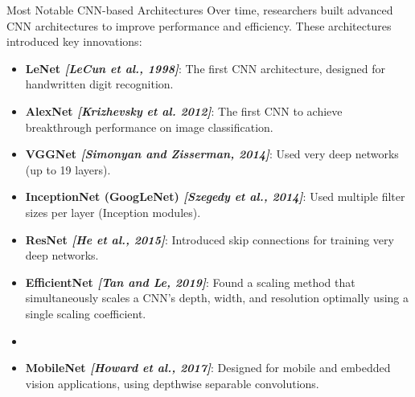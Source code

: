 \begin{frame}{Most Notable CNN-based Architectures}
Over time, researchers built advanced CNN architectures to improve performance and efficiency. These architectures introduced key innovations:
{\small
\begin{itemize}
    \item \textbf{LeNet \emph{[LeCun et al., 1998]}}: The first CNN architecture, designed for handwritten digit recognition.
    \item \textbf{AlexNet \emph{[Krizhevsky et al. 2012]}}:  The first CNN to achieve breakthrough performance on image classification.
    \item \textbf{VGGNet \emph{[Simonyan and Zisserman, 2014]}}: Used very deep networks (up to 19 layers).
    \item \textbf{InceptionNet (GoogLeNet) \emph{[Szegedy et al., 2014]}}: Used multiple filter sizes per layer (Inception modules).
    \item \textbf{ResNet \emph{[He et al., 2015]}}: Introduced skip connections for training very deep networks.
    \item \textbf{EfficientNet \emph{[Tan and Le, 2019]}}: Found a scaling method that  simultaneously scales a CNN’s depth, width, and resolution optimally using a single scaling coefficient.
    \item \item \textbf{MobileNet \emph{[Howard et al., 2017]}}: Designed for mobile and embedded vision applications, using depthwise separable convolutions.
\end{itemize}
}
    
\end{frame}

